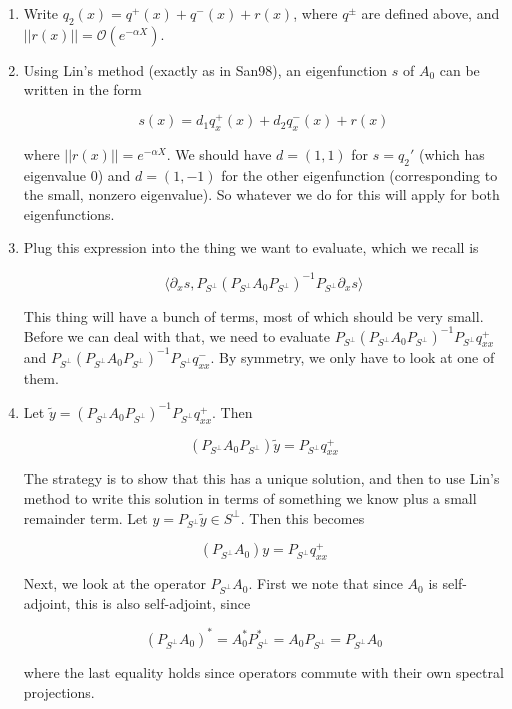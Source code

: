 \documentclass[12pt]{article}
\begin{document}
\begin{enumerate}

\item Write $q_2(x) = q^+(x) + q^-(x) + r(x)$, where $q^\pm$ are defined above, and $||r(x)|| = \mathcal{O}(e^{-\alpha X})$.

\item Using Lin's method (exactly as in San98), an eigenfunction $s$ of $A_0$ can be written in the form

\[
s(x) = d_1 q^+_x(x) + d_2 q^-_x(x) + r(x)
\]

where $||r(x)|| = e^{-\alpha X}$. We should have $d = (1, 1)$ for $s = q_2'$ (which has eigenvalue 0) and $d = (1, -1)$ for the other eigenfunction (corresponding to the small, nonzero eigenvalue). So whatever we do for this will apply for both eigenfunctions.

\item Plug this expression into the thing we want to evaluate, which we recall is

\[
\langle \partial_x s, P_{S^\perp} (P_{S^\perp} A_0 P_{S^\perp})^{-1} P_{S^\perp} \partial_x s \rangle
\]

This thing will have a bunch of terms, most of which should be very small. Before we can deal with that, we need to evaluate $P_{S^\perp} (P_{S^\perp} A_0 P_{S^\perp})^{-1} P_{S^\perp} q^+_{xx}$ and $P_{S^\perp} (P_{S^\perp} A_0 P_{S^\perp})^{-1} P_{S^\perp} q^-_{xx}$. By symmetry, we only have to look at one of them.

\item Let $\tilde{y} = (P_{S^\perp} A_0 P_{S^\perp})^{-1} P_{S^\perp} q^+_{xx}$. Then 

\[
(P_{S^\perp} A_0 P_{S^\perp}) \tilde{y} = P_{S^\perp} q^+_{xx}
\]

The strategy is to show that this has a unique solution, and then to use Lin's method to write this solution in terms of something we know plus a small remainder term. Let $y = P_{S^\perp} \tilde{y} \in S^\perp$. Then this becomes

\[
(P_{S^\perp} A_0) y = P_{S^\perp} q^+_{xx}
\]

Next, we look at the operator $P_{S^\perp} A_0$. First we note that since $A_0$ is self-adjoint, this is also self-adjoint, since

\[
(P_{S^\perp} A_0)^* = A_0^* P_{S^\perp}^* = A_0 P_{S^\perp} = P_{S^\perp} A_0
\]

where the last equality holds since operators commute with their own spectral projections.\\


\end{enumerate}
\end{document}
